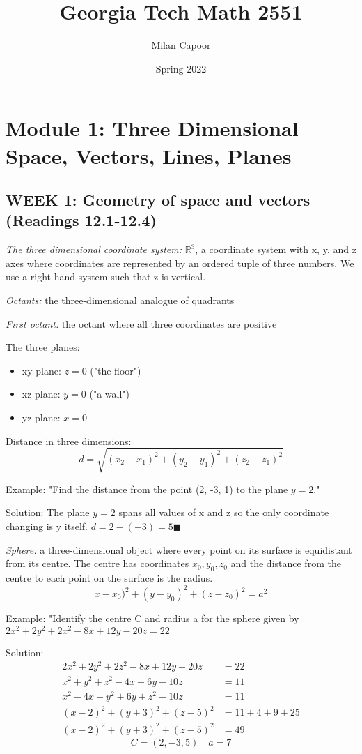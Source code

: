 \documentclass[12pt]{article}
\title{Georgia Tech Math 2551}
\author{Milan Capoor}
\date{Spring 2022}
\newcommand{\R}{\mathbb{R}}
\begin{document}
\maketitle
\section{Module 1: Three Dimensional Space, Vectors, Lines, Planes}
\subsection{WEEK 1: Geometry of space and vectors (Readings 12.1-12.4)}
\emph{The three dimensional coordinate system:} $\R^3$, a coordinate system with x, y, and z axes where coordinates are represented by an ordered tuple of three numbers. We use a right-hand system such that z is vertical. 

\emph{Octants:} the three-dimensional analogue of quadrants

\emph{First octant:} the octant where all three coordinates are positive

The three planes:
\begin{itemize}
    \item xy-plane: $z = 0$ ("the floor")
    \item xz-plane: $y = 0$ ("a wall")
    \item yz-plane: $x = 0$
\end{itemize}

Distance in three dimensions:
\[d = \sqrt{(x_2 - x_1)^2 + (y_2 - y_1)^2 + (z_2 - z_1)^2}\]

Example:
"Find the distance from the point (2, -3, 1) to the plane $y = 2$."

Solution:
The plane $y = 2$ spans all values of x and z so the only coordinate changing is y itself. $d = 2 - (-3) = 5 \blacksquare$

\emph{Sphere:} a three-dimensional object where every point on its surface is equidistant from its centre. The centre has coordinates $x_0, y_0, z_0$ and the distance from the centre to each point on the surface is the radius.
\[x - x_0)^2 + (y-y_0)^2 + (z-z_0)^2 = a^2\]

Example:
"Identify the centre C and radius a for the sphere given by $2x^2 + 2y^2 + 2x^2 - 8x + 12y - 20z  = 22$

Solution:
\begin{align*}
    2x^2 + 2y^2 + 2z^2 - 8x + 12y - 20z  &= 22\\
    x^2 + y^2 + z^2 - 4x + 6y - 10z  &= 11\\
    x^2 - 4x + y^2 + 6y + z^2 - 10z &= 11\\
    (x - 2)^2 + (y + 3)^2 + (z - 5)^2 &= 11 + 4 + 9 + 25\\
    (x - 2)^2 + (y + 3)^2 + (z - 5)^2 &= 49
\end{align*}
\[C = (2, -3, 5) \quad a = 7\]
\end{document}
